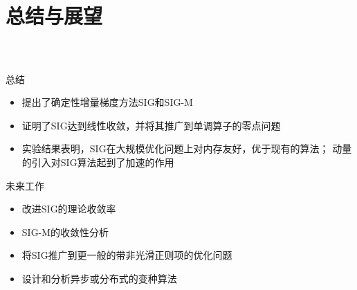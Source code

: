 \section{总结与展望}
\miniframesoff
  \frame
  {
    \frametitle{\secname~ }
    \footnotesize
    \begin{block}{总结}
    \begin{itemize}
        \item 提出了确定性增量梯度方法SIG和SIG-M
        \item 证明了SIG达到线性收敛，并将其推广到单调算子的零点问题
        \item 实验结果表明，SIG在大规模优化问题上对内存友好，优于现有的算法；
              动量的引入对SIG算法起到了加速的作用
    \end{itemize}
    \end{block}

    \pause

    \begin{block}{未来工作}
    \begin{itemize}
        \item 改进SIG的理论收敛率
        \item SIG-M的收敛性分析
        \item 将SIG推广到更一般的带非光滑正则项的优化问题
        \item 设计和分析异步或分布式的变种算法
    \end{itemize}
    \end{block}
  }

